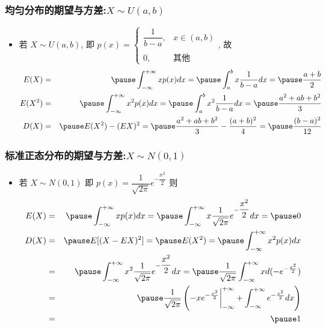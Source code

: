 \documentclass[Prob-All.tex]{subfiles}
\begin{document}
	\begin{frame}
		\frametitle{均匀分布的期望与方差:$X\sim U (a,b)$}
		\begin{itemize}[<+-|alert@+>]
			\item 若 $X\sim U (a,b)$, 即 $p (x)=\left\{\begin{array}{ll}
				\dfrac{1}{b-a}, & x\in (a,b)\\
				\\
				0, & \mbox{其他}
			\end{array}\right.
			$, 故 \pause
			\begin{eqnarray*}
				E(X)&=&\pause \int_{-\infty}^{+\infty}xp(x)dx=\pause \int_a^bx\dfrac{1}{b-a}dx=\pause \dfrac{a+b}{2}\\
				E(X^2)&=&\pause \int_{-\infty}^{+\infty}x^2p(x)dx=\pause \int_a^bx^2\dfrac{1}{b-a}dx=\pause \dfrac{a^2+ab+b^2}{3}\\
				D(X)&=&\pause E(X^2)-(EX)^2=\pause \dfrac{a^2+ab+b^2}{3}-\dfrac{(a+b)^2}{4}=\pause \dfrac{(b-a)^2}{12}
			\end{eqnarray*}
		\end{itemize}
	\end{frame}
	\begin{frame}
		\frametitle{标准正态分布的期望与方差:$X\sim N (0,1)$}
		\begin{itemize}
			\item 若 $X\sim N (0,1)$ 即 $p (x)=\dfrac{1}{\sqrt{2\pi}} e^{-\dfrac{x^2}{2}}$ 则
			\begin{eqnarray*}
				E(X)&=&\pause \int_{-\infty}^{+\infty}xp(x)dx=\pause \int_{-\infty}^{+\infty}x\dfrac{1}{\sqrt{2\pi}}e^{-\dfrac{x^2}{2}}dx=\pause 0\\
				D(X)&=&\pause E[(X-EX)^2]=\pause E(X^2)=\pause \int_{-\infty}^{+\infty}x^2p(x)dx\\
				&=&\pause \int_{-\infty}^{+\infty}x^2\dfrac{1}{\sqrt{2\pi}}e^{-\dfrac{x^2}{2}}dx=\pause \dfrac{1}{\sqrt{2\pi}}\int_{-\infty}^{+\infty}xd(-e^{-\frac{x^2}{2}})\\
				&=&\pause\dfrac{1}{\sqrt{2\pi}}\left(-xe^{-\frac{x^2}{2}}\bigg|_{-\infty}^{+\infty}+\int_{-\infty}^{+\infty}e^{-\frac{x^2}{2}}dx\right)\\
				&=&\pause 1
			\end{eqnarray*}

		\end{itemize}
	\end{frame}
\end{document}
